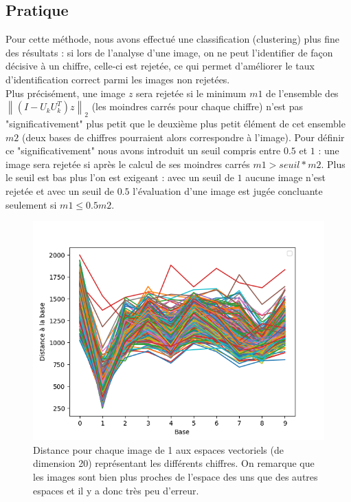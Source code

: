 \documentclass[a4paper,11pt,twoside]{report}
\newcommand{\norm}[1]{\left\lVert#1\right\rVert} %
\begin{document}
\subsection{Pratique}

Pour cette méthode, nous avons effectué une classification (clustering) plus fine des résultats : si lors de l'analyse d'une image, on ne peut l'identifier de façon décisive à un chiffre, celle-ci est rejetée, ce qui permet d'améliorer le taux d'identification correct parmi les images non rejetées. \\
Plus précisément, une image $z$ sera rejetée si le minimum $m1$ de l'ensemble des $ \norm{(I-U_{k}U_{k}^{T})z}_{2}$ (les moindres carrés pour chaque chiffre) n'est pas "significativement" plus petit que le deuxième plus petit élément de cet ensemble $m2$ (deux bases de chiffres pourraient alors correspondre à l'image). Pour définir ce "significativement" nous avons introduit un seuil compris entre $0.5$ et $1$ : une image sera rejetée si après le calcul de ses moindres carrés $m1>seuil*m2$. Plus le seuil est bas plus l'on est exigeant : avec un seuil de $1$ aucune image n'est rejetée et avec un seuil de $0.5$ l'évaluation d'une image est jugée concluante seulement si $m1\leq 0.5m2$.
\clearpage

\begin{figure}[H]
\begin{center}
  	\includegraphics[width=0.7\linewidth]{Graphs/Distance_bases_20_1.png}
  	\caption{Distance pour chaque image de 1 aux espaces vectoriels (de dimension 20) représentant les différents chiffres. On remarque que les images sont bien plus proches de l'espace des uns que des autres espaces et il y a donc très peu d'erreur.}
  	\end{center}
\end{figure}
\end{document}
